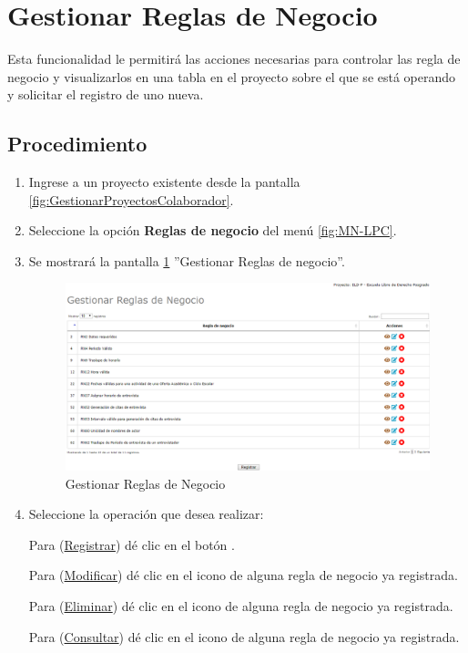 \hypertarget{cv:gestionarBR}{\section{Gestionar Reglas de Negocio}} \label{sec:GestionarBR}

	Esta funcionalidad le permitirá las acciones necesarias para controlar las regla de negocio y visualizarlos en una tabla en el proyecto sobre el que se está operando y solicitar el registro de uno nueva.

		\subsection{Procedimiento}

			\begin{enumerate}
				
			\item Ingrese a un proyecto existente desde la pantalla \ref{fig:GestionarProyectosColaborador}.
	
			\item Seleccione la opción \textbf{Reglas de negocio} del menú \ref{fig:MN-LPC}.
	
			\item Se mostrará la pantalla \ref{fig:GestionarBR} ''Gestionar Reglas de negocio''.

			\begin{figure}[h!]
				\begin{center}
					\includegraphics[scale=0.5]{roles/lider/reglasNegocio/pantallas/IU8gestionarBR}
					\caption{Gestionar Reglas de Negocio}
					\label{fig:GestionarBR}
				\end{center}
			\end{figure}
		
				\item Seleccione la operación que desea realizar:
			
			Para (\hyperlink{cv:registrarBR}{Registrar}) dé clic en el botón \IURegistrar.
			
			Para (\hyperlink{cv:modificarBR}{Modificar}) dé clic en el icono \IUEditar{} de alguna regla de negocio ya registrada.
			
			Para (\hyperlink{cv:eliminarBR}{Eliminar}) dé clic en el icono \IUBotonEliminar{} de alguna regla de negocio ya registrada.
			
			Para (\hyperlink{cv:consultarBR}{Consultar}) dé clic en el icono \IUConsultar{} de alguna regla de negocio ya registrada.
			\end{enumerate}